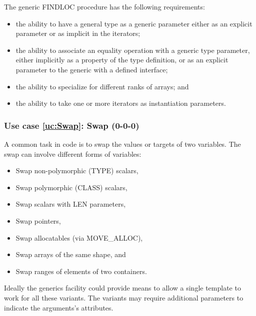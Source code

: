 \documentclass{article}
\newcounter{usecase}
\newcounter{requirement}
\newcommand{\newusecase}[2]{
\refstepcounter{usecase}\label{uc:#1}
\subsubsection{Use case \ref{uc:#1}: #1 (#2)}}
\begin{document}
The generic {\rm FINDLOC} procedure has the following requirements:
\begin{itemize}
\item the ability to have a general type as a generic parameter
  either as an explicit parameter or as implicit in the iterators;

\item the ability to associate an equality operation with a generic
  type parameter, either implicitly
  as a property of the type definition, or as an explicit parameter to
  the generic with a defined interface;

\item the ability to specialize for different ranks of arrays; and

\item the ability to take one or more iterators as instantiation
  parameters.

\end{itemize}

\newusecase{Swap}{0-0-0}

A common task in code is to swap the values or targets of two
variables. The swap can involve different forms of variables:
\begin{itemize}
\item Swap non-polymorphic (TYPE) scalars,
\item Swap polymorphic (CLASS) scalars,
\item Swap scalars with LEN parameters,
\item Swap pointers,
\item Swap allocatables (via {\rm MOVE\_ALLOC}),
\item Swap arrays of the same shape, and
\item Swap ranges of elements of two containers.
\end{itemize}
Ideally the generics facility could provide means to allow a single template to work for all these variants.   The variants may require additional parameters to indicate the arguments's attributes.
\end{document}

